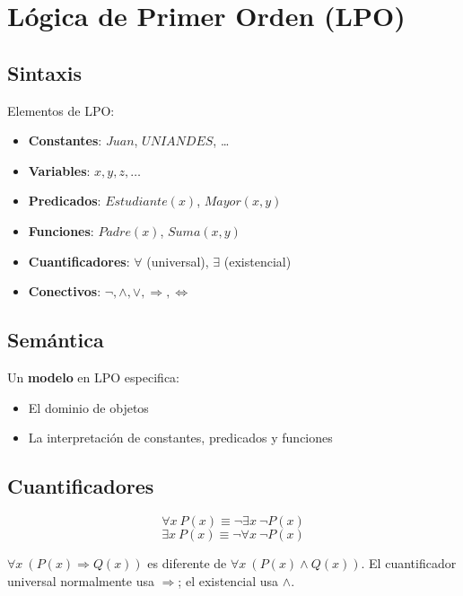 \section{Lógica de Primer Orden (LPO)}

\subsection{Sintaxis}

Elementos de LPO:
\begin{itemize}
    \item \textbf{Constantes}: $Juan$, $UNIANDES$, \ldots
    \item \textbf{Variables}: $x, y, z, \ldots$
    \item \textbf{Predicados}: $Estudiante(x)$, $Mayor(x, y)$
    \item \textbf{Funciones}: $Padre(x)$, $Suma(x, y)$
    \item \textbf{Cuantificadores}: $\forall$ (universal), $\exists$ (existencial)
    \item \textbf{Conectivos}: $\neg, \land, \lor, \Rightarrow, \Leftrightarrow$
\end{itemize}

\subsection{Semántica}

Un \textbf{modelo} en LPO especifica:
\begin{itemize}
    \item El dominio de objetos
    \item La interpretación de constantes, predicados y funciones
\end{itemize}

\subsection{Cuantificadores}

$$\forall x\ P(x) \equiv \neg \exists x\ \neg P(x)$$
$$\exists x\ P(x) \equiv \neg \forall x\ \neg P(x)$$

\begin{remark}
$\forall x\ (P(x) \Rightarrow Q(x))$ es diferente de $\forall x\ (P(x) \land Q(x))$.
El cuantificador universal normalmente usa $\Rightarrow$; el existencial usa $\land$.
\end{remark}

